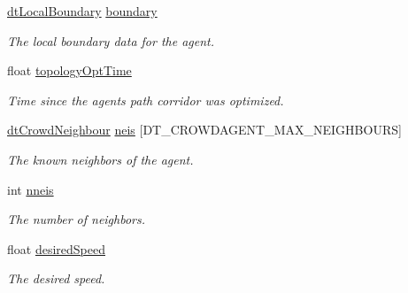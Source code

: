 \begin{DoxyCompactItemize}
\hyperlink{classdtLocalBoundary}{dt\+Local\+Boundary} \hyperlink{structdtCrowdAgent_a68fc2f237bd2ac88e4aed6afe6a77951}{boundary}
\begin{DoxyCompactList}\small\item\em The local boundary data for the agent. \end{DoxyCompactList}\item 
\mbox{\label{structdtCrowdAgent_a6c9330e499ceb3df18e047130a29f8f8}} 
float \hyperlink{structdtCrowdAgent_a6c9330e499ceb3df18e047130a29f8f8}{topology\+Opt\+Time}
\begin{DoxyCompactList}\small\item\em Time since the agent\textquotesingle{}s path corridor was optimized. \end{DoxyCompactList}\item 
\mbox{\label{structdtCrowdAgent_a00fbfb7b00f0e352cb2c6486a97d8eb4}} 
\hyperlink{structdtCrowdNeighbour}{dt\+Crowd\+Neighbour} \hyperlink{structdtCrowdAgent_a00fbfb7b00f0e352cb2c6486a97d8eb4}{neis} \mbox{[}D\+T\+\_\+\+C\+R\+O\+W\+D\+A\+G\+E\+N\+T\+\_\+\+M\+A\+X\+\_\+\+N\+E\+I\+G\+H\+B\+O\+U\+RS\mbox{]}
\begin{DoxyCompactList}\small\item\em The known neighbors of the agent. \end{DoxyCompactList}\item 
\mbox{\label{structdtCrowdAgent_a250ba2f5d9ebd40b88ad770aced4aeab}} 
int \hyperlink{structdtCrowdAgent_a250ba2f5d9ebd40b88ad770aced4aeab}{nneis}
\begin{DoxyCompactList}\small\item\em The number of neighbors. \end{DoxyCompactList}\item 
\mbox{\label{structdtCrowdAgent_ac15a23fd617433db5be5544462ec34d8}} 
float \hyperlink{structdtCrowdAgent_ac15a23fd617433db5be5544462ec34d8}{desired\+Speed}
\begin{DoxyCompactList}\small\item\em The desired speed. \end{DoxyCompactList}\item 
\mbox{\label{structdtCrowdAgent_a7fca233de63765485755b1d3fac0dc97}} 

\end{DoxyCompactItemize}
